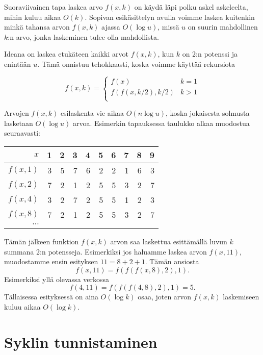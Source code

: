 Suoraviivainen tapa laskea arvo $f(x,k)$
on käydä läpi polku askel askeleelta, mihin kuluu aikaa $O(k)$.
Sopivan esikäsittelyn avulla voimme laskea kuitenkin
minkä tahansa arvon $f(x,k)$ ajassa $O(\log u)$,
missä $u$ on suurin mahdollinen $k$:n arvo,
jonka laskeminen tulee olla mahdollista.

Ideana on laskea etukäteen kaikki arvot $f(x,k)$, kun $k$ on 2:n potenssi
ja enintään $u$.
Tämä onnistuu tehokkaasti, koska voimme käyttää rekursiota

\begin{equation*}
    f(x,k) = \begin{cases}
               f(x)              & k = 1\\
               f(f(x,k/2),k/2)   & k > 1\\
           \end{cases}
\end{equation*}

Arvojen $f(x,k)$ esilaskenta vie aikaa $O(n \log u)$,
koska jokaisesta solmusta lasketaan $O(\log u)$ arvoa.
Esimerkin tapauksessa taulukko alkaa muodostua seuraavasti:

\begin{center}
\begin{tabular}{r|rrrrrrrrr}
$x$ & 1 & 2 & 3 & 4 & 5 & 6 & 7 & 8 & 9 \\
\hline
$f(x,1)$ & 3 & 5 & 7 & 6 & 2 & 2 & 1 & 6 & 3 \\
$f(x,2)$ & 7 & 2 & 1 & 2 & 5 & 5 & 3 & 2 & 7 \\
$f(x,4)$ & 3 & 2 & 7 & 2 & 5 & 5 & 1 & 2 & 3 \\
$f(x,8)$ & 7 & 2 & 1 & 2 & 5 & 5 & 3 & 2 & 7 \\
$\cdots$ \\
\end{tabular}
\end{center}

Tämän jälkeen funktion $f(x,k)$ arvon saa laskettua
esittämällä luvun $k$ summana 2:n potensseja.
Esimerkiksi jos haluamme laskea arvon $f(x,11)$,
muodostamme ensin esityksen $11=8+2+1$.
Tämän ansiosta
\[f(x,11)=f(f(f(x,8),2),1).\]
Esimerkiksi yllä olevassa verkossa 
\[f(4,11)=f(f(f(4,8),2),1)=5.\]
Tällaisessa esityksessä on aina
$O(\log k)$ osaa, joten arvon $f(x,k)$ laskemiseen
kuluu aikaa $O(\log k)$.

\section{Syklin tunnistaminen}

